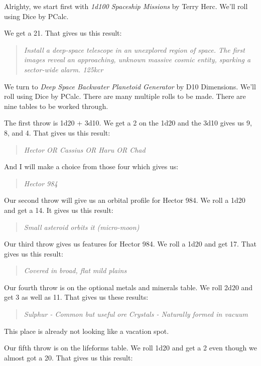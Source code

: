 Alrighty, we start first with \emph{1d100 Spaceship Missions} by Terry
Herc. We'll roll using Dice by PCalc.

We get a 21. That gives us this result:

\begin{quote}
\emph{Install a deep-space telescope in an unexplored region of space.
The first images reveal an approaching, unknown massive cosmic entity,
sparking a sector-wide alarm. 125kcr}
\end{quote}

We turn to \emph{Deep Space Backwater Planetoid Generator} by D10
Dimensions. We'll roll using Dice by PCalc. There are many multiple
rolls to be made. There are nine tables to be worked through.

The first throw is 1d20 + 3d10. We get a 2 on the 1d20 and the 3d10
gives us 9, 8, and 4. That gives us this result:

\begin{quote}
\emph{Hector OR Cassius OR Haru OR Chad}
\end{quote}

And I will make a choice from those four which gives us:

\begin{quote}
\emph{Hector 984}
\end{quote}

Our second throw will give us an orbital profile for Hector 984. We roll
a 1d20 and get a 14. It gives us this result:

\begin{quote}
\emph{Small asteroid orbits it (micro-moon)}
\end{quote}

Our third throw gives us features for Hector 984. We roll a 1d20 and get
17. That gives us this result:

\begin{quote}
\emph{Covered in broad, flat mild plains}
\end{quote}

Our fourth throw is on the optional metals and minerals table. We roll
2d20 and get 3 as well as 11. That gives us these results:

\begin{quote}
\emph{Sulphur - Common but useful ore} \emph{Crystals - Naturally formed
in vacuum}
\end{quote}

This place is already not looking like a vacation spot.

Our fifth throw is on the lifeforms table. We roll 1d20 and get a 2 even
though we almost got a 20. That gives us this result:

